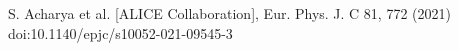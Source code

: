 S. Acharya et al. [ALICE Collaboration], Eur. Phys. J. C 81, 772 (2021) doi:10.1140/epjc/s10052-021-09545-3